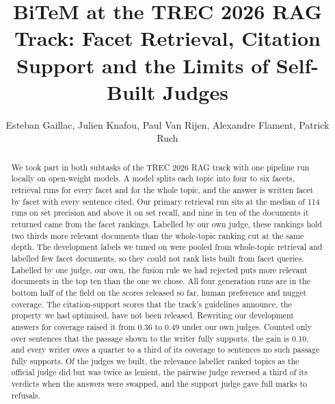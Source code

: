 \documentclass[sigconf,nonacm]{acmart}
\begin{document}
\title{BiTeM at the TREC 2026 RAG Track: Facet Retrieval, Citation Support and
       the Limits of Self-Built Judges}

\author{Esteban Gaillac, Julien Knafou, Paul Van Rijen, Alexandre Flament, Patrick Ruch}

\renewcommand{\shortauthors}{Gaillac et al.}

\begin{abstract}
We took part in both subtasks of the TREC 2026 RAG track with one pipeline run
locally on open-weight models. A model splits each topic into four to six facets,
retrieval runs for every facet and for the whole topic, and the answer is written
facet by facet with every sentence cited. Our primary retrieval run sits at the
median of 114 runs on set precision and above it on set recall, and nine in ten of
the documents it returned came from the facet rankings. Labelled by our own judge,
these rankings hold two thirds more relevant documents than the whole-topic ranking
cut at the same depth.
The development labels we tuned on were pooled from whole-topic retrieval and
labelled few facet documents, so they could not rank lists built from facet
queries. Labelled by one judge, our own, the fusion rule we had rejected puts more
relevant documents in the top ten than the one we chose. All four generation runs are in the bottom half of the
field on the scores released so far, human preference and nugget coverage. The
citation-support scores that the track's guidelines announce, the property we had
optimised, have not been released. Rewriting our development answers for coverage
raised it from 0.36 to 0.49 under our own judges. Counted only over sentences that
the passage shown to the writer fully supports, the gain is 0.10, and every writer
owes a quarter to a third of its coverage to sentences no such passage fully
supports. Of the judges we
built, the relevance labeller ranked topics as the official judge did but was twice
as lenient, the pairwise judge reversed a third of its verdicts when the answers
were swapped, and the support judge gave full marks to refusals.
\end{abstract}

\end{document}
